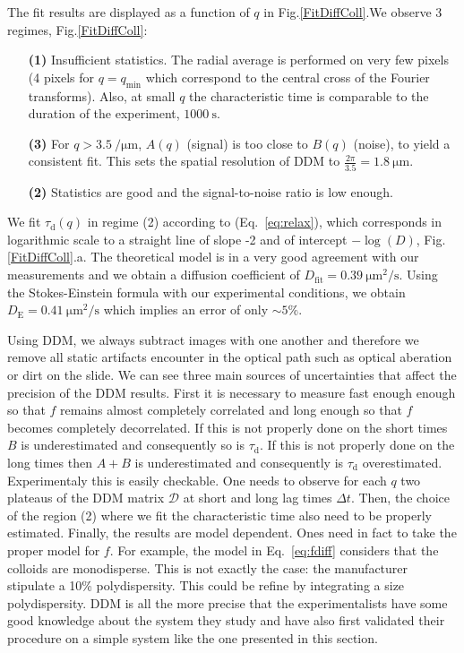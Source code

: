 \documentclass[prb,reprint,amsmath,amssymb]{revtex4-1}
\newcommand{\tg}[1]{{\color{magenta}#1}} %
\begin{document}
The fit results are displayed  as a function of $q$ in Fig.\ref{FitDiffColl}.We observe 3 regimes,  Fig.\ref{FitDiffColl}:
\begin{itemize}
\item[\textbf{(1)}] Insufficient statistics. The radial average is performed on very few pixels (4 pixels for $q = q_\text{min}$ which correspond to the central cross of the Fourier transforms).  Also, at small $q$ the characteristic time is comparable to the duration of the experiment, $\SI{1000}{\second}$.
\item[\textbf{(3)}] For  $q>\SI{3.5}{\per\micro\meter}$, $A(q)$ (signal) is too close to $B(q)$ (noise), to yield a consistent fit. This sets the spatial resolution of DDM to  $\frac{2\pi}{3.5} = \SI{1.8}{\micro\meter}$.
\item[\textbf{(2)}] Statistics are good and the signal-to-noise ratio is low enough.
\end{itemize}

We fit $\tau_\text{d}(q)$ in regime (2) according to (Eq.~\ref{eq:relax}), which corresponds in logarithmic scale to a straight line of slope -2 and of intercept $-\log(D)$, Fig.\ref{FitDiffColl}.a. The theoretical model is in a very good agreement with our measurements and we obtain a diffusion coefficient of $D_\text{fit} = \SI{0.39}{\micro\meter\squared\per\second}$. Using the Stokes-Einstein formula with our experimental conditions, we obtain $D_\text{E} = \SI{0.41}{\micro\meter\squared\per\second}$ which implies an error of only $\sim 5 \%$. 

\tg{Using DDM, we always subtract images with one another and therefore we remove all static artifacts encounter in the optical path such as optical aberation or dirt on the slide. We can see three main sources of uncertainties that affect the precision of the DDM results. First it is necessary to measure fast enough enough so that $f$ remains almost completely correlated and long enough so that $f$ becomes completely  decorrelated. If this is not properly done on the short times $B$ is underestimated and consequently so is $\tau_\text{d}$. If this is not properly done on the long times then  $A+B$ is underestimated and consequently is $\tau_\text{d}$ overestimated. Experimentaly this is easily checkable. One needs to observe for each $q$ two plateaus of the DDM matrix $\mathcal{D}$ at short and long lag times $\Delta t$. Then, the choice of the region (2) where we fit the characteristic time also need to be properly estimated. Finally, the results are model dependent. Ones need in fact to take the proper model for $f$. For example, the model in Eq.~\eqref{eq:fdiff}  considers that the colloids are monodisperse. This is not exactly the case: the manufacturer stipulate a 10\% polydispersity. This could be refine by integrating a size polydispersity. DDM is all the more precise that the experimentalists have some good knowledge about the system they study and have also first validated their procedure on a simple system like the one presented in this section}.
\end{document}
